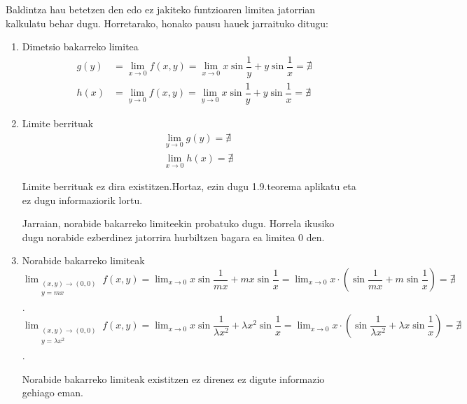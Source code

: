 Baldintza hau betetzen den edo ez jakiteko funtzioaren limitea jatorrian kalkulatu behar dugu. Horretarako, honako pausu hauek jarraituko ditugu:
\begin{enumerate}
    \item Dimetsio bakarreko limitea
    \begin{eqnarray*}
        &g(y)&=\lim_{x \to 0}f(x,y)=\lim_{x \to 0} x\sin \dfrac{1}{y} +y \sin \dfrac{1}{x}= \nexists\\
        &h(x)&=\lim_{y \to 0}f(x,y)=\lim_{y \to 0} x\sin \dfrac{1}{y} +y \sin \dfrac{1}{x}= \nexists
    \end{eqnarray*}
    
    \item Limite berrituak
    \begin{eqnarray*}
        &&\lim_{y \to 0}g(y)=\nexists\\
        &&\lim_{x \to 0}h(x)=\nexists
    \end{eqnarray*}
    
    Limite berrituak ez dira existitzen.Hortaz, ezin dugu 1.9.teorema aplikatu eta ez dugu informaziorik lortu. 
    
    Jarraian, norabide bakarreko limiteekin probatuko dugu. Horrela ikusiko dugu norabide ezberdinez jatorrira hurbiltzen bagara ea limitea 0 den.
    \item Norabide bakarreko limiteak \newline
    \newline
    $\displaystyle{ \lim_{ \begin{array}{c} \scriptstyle (x,y) \rightarrow (0,0) \\ \scriptstyle y=mx \\ \end{array} } f(x,y)= \lim_{x \rightarrow 0} x\sin \dfrac{1}{mx} +mx \sin \dfrac{1}{x}=\lim_{x \rightarrow 0} x\cdot\left(\sin \dfrac{1}{mx} +m \sin \dfrac{1}{x}\right)=\nexists } $.
    \newline
    $\displaystyle{ \lim_{ \begin{array}{c} \scriptstyle (x,y) \rightarrow (0,0) \\ \scriptstyle y=\lambda x^2 \\ \end{array} }f(x,y)= \lim_{x \rightarrow 0} x\sin \dfrac{1}{\lambda x^2} +\lambda x^2 \sin \dfrac{1}{x}=\lim_{x \rightarrow 0} x\cdot\left(\sin \dfrac{1}{\lambda x^2} +\lambda x \sin \dfrac{1}{x}\right)=\nexists } $.
    
    Norabide bakarreko limiteak existitzen ez direnez ez digute informazio gehiago eman.
    

\end{enumerate}
